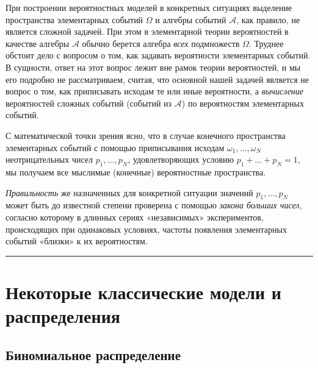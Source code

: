 \documentclass[11pt,a4paper]{article}
\renewcommand{\linethickness}{0.1ex}
\begin{document}
При построении вероятностных моделей в конкретных ситуациях выделение
пространства элементарных событий \(\Omega\) и алгебры событий
\(\mathcal{A}\), как правило, не является сложной задачей. При этом в
элементарной теории вероятностей в качестве алгебры \(\mathcal{A}\)
обычно берется алгебра \emph{всех} подмножеств \(\Omega\). Труднее
обстоит дело с вопросом о том, как задавать вероятности элементарных
событий. В сущности, ответ на этот вопрос лежит вне рамок теории
вероятностей, и мы его подробно не рассматриваем, считая, что основной
нашей задачей является не вопрос о том, как приписывать исходам те или
иные вероятности, а \emph{вычисление} вероятностей сложных событий
(событий из \(\mathcal{A}\)) по вероятностям элементарных событий.

С математической точки зрения ясно, что в случае конечного пространства
элементарных событий с помощью приписывания исходам
\(\omega_1, \ldots , \omega_N\) неотрицательных чисел
\(p_1, \ldots , p_N\), удовлетворяющих условию
\(p_1 + \ldots + p_N = 1\), мы получаем все мыслимые (конечные)
вероятностные пространства.

\emph{Правильность} же назначенных для конкретной ситуации значений
\(p_1, \ldots , p_N\) может быть до известной степени проверена с
помощью \emph{закона больших чисел}, согласно которому в длинных сериях
«независимых» экспериментов, происходящих при одинаковых условиях,
частоты появления элементарных событий «близки» к их вероятностям.

    \begin{center}\rule{0.5\linewidth}{\linethickness}\end{center}

    \hypertarget{ux43dux435ux43aux43eux442ux43eux440ux44bux435-ux43aux43bux430ux441ux441ux438ux447ux435ux441ux43aux438ux435-ux43cux43eux434ux435ux43bux438-ux438-ux440ux430ux441ux43fux440ux435ux434ux435ux43bux435ux43dux438ux44f}{%
\section{Некоторые классические модели и
распределения}\label{ux43dux435ux43aux43eux442ux43eux440ux44bux435-ux43aux43bux430ux441ux441ux438ux447ux435ux441ux43aux438ux435-ux43cux43eux434ux435ux43bux438-ux438-ux440ux430ux441ux43fux440ux435ux434ux435ux43bux435ux43dux438ux44f}}

    \hypertarget{ux431ux438ux43dux43eux43cux438ux430ux43bux44cux43dux43eux435-ux440ux430ux441ux43fux440ux435ux434ux435ux43bux435ux43dux438ux435}{%
\subsection{Биномиальное
распределение}\label{ux431ux438ux43dux43eux43cux438ux430ux43bux44cux43dux43eux435-ux440ux430ux441ux43fux440ux435ux434ux435ux43bux435ux43dux438ux435}}
\end{document}
